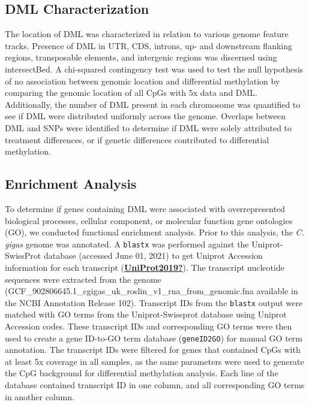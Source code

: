 \documentclass [11pt, proquest] {uwthesis}[2015/03/03]
\begin{document}
\hypertarget{dml-characterization}{%
\subsection{DML Characterization}\label{dml-characterization}}

The location of DML was characterized in relation to various genome feature tracks. Presence of DML in UTR, CDS, introns, up- and downstream flanking regions, transposable elements, and intergenic regions was discerned using intersectBed. A chi-squared contingency test was used to test the null hypothesis of no association between genomic location and differential methylation by comparing the genomic location of all CpGs with 5x data and DML. Additionally, the number of DML present in each chromosome was quantified to see if DML were distributed uniformly across the genome. Overlaps between DML and SNPs were identified to determine if DML were solely attributed to treatment differences, or if genetic differences contributed to differential methylation.

\hypertarget{enrichment-analysis}{%
\subsection{Enrichment Analysis}\label{enrichment-analysis}}

To determine if genes containing DML were associated with overrepresented biological processes, cellular component, or molecular function gene ontologies (GO), we conducted functional enrichment analysis. Prior to this analysis, the \emph{C. gigas} genome was annotated. A \texttt{blastx} was performed against the Uniprot-SwissProt database (accessed June 01, 2021) to get Uniprot Accession information for each transcript (\protect\hyperlink{ref-UniProt2019}{\textbf{UniProt2019?}}). The transcript nucleotide sequences were extracted from the genome (GCF\_902806645.1\_cgigas\_uk\_roslin\_v1\_rna\_from\_genomic.fna available in the NCBI Annotation Release 102). Transcript IDs from the \texttt{blastx} output were matched with GO terms from the Uniprot-Swissprot database using Uniprot Accession codes. These transcript IDs and corresponding GO terms were then used to create a gene ID-to-GO term database (\texttt{geneID2GO}) for manual GO term annotation. The transcript IDs were filtered for genes that contained CpGs with at least 5x coverage in all samples, as the same parameters were used to generate the CpG background for differential methylation analysis. Each line of the database contained transcript ID in one column, and all corresponding GO terms in another column.
\end{document}

